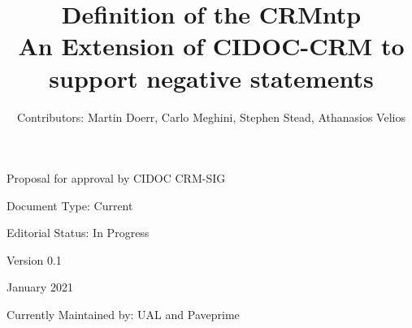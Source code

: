 \title{%
  Definition of the CRMntp \\
  \vspace*{30px}
  \large An Extension of CIDOC-CRM to \\
    support negative statements}

\maketitle

\begin{center}
Proposal for approval by CIDOC CRM-SIG
\par\end{center}
\vspace*{50px}
\begin{center}
Document Type: Current
\par\end{center}
\vspace*{50px}
\begin{center}
Editorial Status: In Progress
\par\end{center}
\vspace*{50px}
\begin{center}
Version 0.1
\par\end{center}
\vspace*{20px}
\begin{center}
January 2021
\par\end{center}
\vspace*{50px}
\begin{center}
Currently Maintained by: UAL and Paveprime
\par\end{center}
\vspace*{20px}
\begin{center}
\author{Contributors: Martin Doerr, Carlo Meghini, Stephen Stead, Athanasios
Velios}
\par\end{center}
